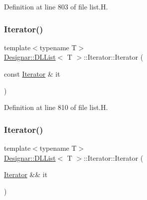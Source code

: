 Definition at line 803 of file list.\+H.

\mbox{\label{class_designar_1_1_d_l_list_1_1_iterator_a824a391fc47274867bffac143a3d740b}} 
\subsubsection{\texorpdfstring{Iterator()}{Iterator()}\hspace{0.1cm}{\footnotesize\ttfamily [4/5]}}
{\footnotesize\ttfamily template$<$typename T$>$ \\
\hyperlink{class_designar_1_1_d_l_list}{Designar\+::\+D\+L\+List}$<$ T $>$\+::Iterator\+::\+Iterator (\begin{DoxyParamCaption}\item[{const \hyperlink{class_designar_1_1_d_l_list_1_1_iterator}{Iterator} \&}]{it }\end{DoxyParamCaption})\hspace{0.3cm}{\ttfamily [inline]}}



Definition at line 810 of file list.\+H.

\mbox{\label{class_designar_1_1_d_l_list_1_1_iterator_ad6d70cfea31c61502831f20b87d4f56f}} 
\subsubsection{\texorpdfstring{Iterator()}{Iterator()}\hspace{0.1cm}{\footnotesize\ttfamily [5/5]}}
{\footnotesize\ttfamily template$<$typename T$>$ \\
\hyperlink{class_designar_1_1_d_l_list}{Designar\+::\+D\+L\+List}$<$ T $>$\+::Iterator\+::\+Iterator (\begin{DoxyParamCaption}\item[{\hyperlink{class_designar_1_1_d_l_list_1_1_iterator}{Iterator} \&\&}]{it }\end{DoxyParamCaption})\hspace{0.3cm}{\ttfamily [inline]}}



